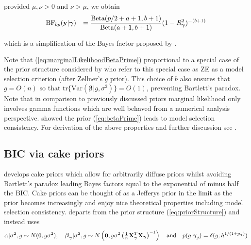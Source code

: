 \documentclass[12pt]{article}
\def\vectorfontone{\bf}
\def\vectorfonttwo{\boldsymbol}
\def\vy{{\vectorfontone y}}                      %
\def\vzero{{\vectorfontone 0}}
\def\vbeta{{\vectorfonttwo \beta}}               %
\def\vgamma{{\vectorfonttwo \gamma}}             %
\def\matrixfontone{\bf}
\def\mX{{\matrixfontone X}}                      %
\def\ds{\displaystyle}
\begin{document}
\noindent provided $\mu,\nu>0$ and $\nu>\mu$, we obtain
\begin{equation}\label{eq:marginalLikelihoodBetaPrime}
\begin{array}{rl}
\ds \mbox{BF}_{bp}(\vy|\vgamma) 
& \ds 
=   
\frac{\mbox{Beta}(p/2 + a + 1,b + 1)}{\mbox{Beta}(a+1,b+1)} (1-R_\vgamma^2)^{-(b + 1)}
%
\end{array}
\end{equation}

\noindent which is a simplification of the Bayes factor proposed by
\cite{Maruyama2011}.


Note that (\ref{eq:marginalLikelihoodBetaPrime}) proportional
to a special case of the prior structure considered by \cite{Maruyama2011}
who refer to this special case as ZE as a model selection criterion (after Zellner's $g$ prior). This choice of $b$ also ensures that $g = O(n)$ so that $\mbox{tr}\{\mbox{Var}(\vbeta | g, \sigma^2)\} = O(1)$, preventing Bartlett's paradox. 
Note that in comparison to previously discussed priors
marginal likelihood only involves gamma functions which
are well behaved from a numerical analysis perspective. 
\cite{Maruyama2011} showed the prior (\ref{eq:betaPrime}) leads to model
selection consistency.
For derivation of the above properties and further discussion see \cite{Maruyama2011}.




\subsection{BIC via cake priors}  

\cite{OrmerodEtal2017} develops cake priors which allow for arbitrarily diffuse priors
whilst avoiding Bartlett's paradox leading Bayes factors equal to the exponential of minus half
the BIC. Cake priors
can be thought of as a Jefferys prior in the limit
as the prior becomes increasingly
and enjoy nice theoretical properties including model
selection consistency. \cite{OrmerodEtal2017} 
departs from the prior structure (\ref{eq:priorStructure}) and instead uses
\begin{equation}\label{eq:proirs2}
\ds \alpha|\sigma^2,g \sim N(0,g\sigma^2), \quad 
\ds \vbeta_\vgamma|\sigma^2,g \sim N\left( \vzero,g\sigma^2\left( \tfrac{1}{n}\mX_\vgamma^T\mX_\vgamma\right)^{-1}\right)
\quad \mbox{and} \quad
p(g|\vgamma_j) = \delta(g; h^{1/(1 + p_\vgamma)})
\end{equation}
\end{document}
